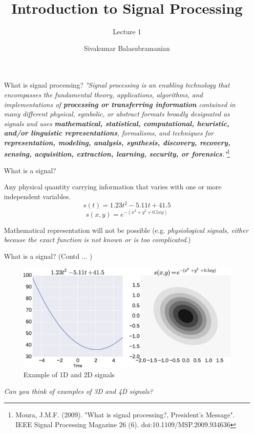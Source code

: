\documentclass{beamer}
\title{Introduction to Signal Processing}
\subtitle{Lecture 1}
\author{Sivakumar Balasubramanian}
\institute[Christian Medical College] %
{
  \inst{}%
  Department of Bioengineering\\
  Christian Medical College, Bagayam\\
  Vellore 632002
}
\date{}
\begin{document}
\begin{frame}
  \titlepage
\end{frame}

\begin{frame}{What is signal processing?}
\textit{
"Signal processing is an enabling technology that encompasses the fundamental theory, applications, algorithms, and implementations of \textbf{processing or transferring information} contained in many different physical, symbolic, or abstract formats broadly designated as signals and uses \textbf{mathematical, statistical, computational, heuristic, and/or linguistic representations}, formalisms, and techniques for \textbf{representation, modeling, analysis, synthesis, discovery, recovery, sensing, acquisition, extraction, learning, security, or forensics}."}\footnote{\tiny{Moura, J.M.F. (2009). "What is signal processing?, President’s Message". IEEE Signal Processing Magazine 26 (6). doi:10.1109/MSP.2009.934636}}
\end{frame}

\begin{frame}{What is a signal?}

Any physical quantity carrying information that varies with one or more independent variables.
$$ s\left(t\right) = 1.23t^2 - 5.11t +41.5 $$
$$ s\left(x,y\right) = e^{-(x^2 + y^2 + 0.5xy)} $$

Mathematical representation will not be possible (e.g. \textit{physiological signals,  either because the exact function is not known or is too complicated}.)
\end{frame}

\begin{frame}{What is a signal? (Contd ... )}

\begin{figure}
\includegraphics[width=\textwidth]{img/signals.eps}
\caption{Example of 1D and 2D signals}
\end{figure}

\textit{Can you think of examples of 3D and 4D signals?}
\end{frame}
\end{document}
